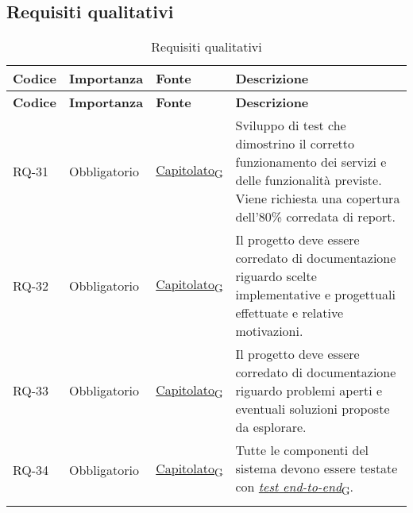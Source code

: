 \subsection{Requisiti qualitativi}
\begin{longtable}{|>{\centering\arraybackslash}m{}|>{\centering\arraybackslash}m{}|>{\centering\arraybackslash}m{}|>{\centering\arraybackslash}m{}|}
	\hline
	\textbf{Codice} & \textbf{Importanza} & \textbf{Fonte}                                                                                                    & \textbf{Descrizione}                                                                                                                                                                            \\\hline
	\endfirsthead
	\hline
	\textbf{Codice} & \textbf{Importanza} & \textbf{Fonte}                                                                                                    & \textbf{Descrizione}                                                                                                                                                                            \\\hline
	\endhead
	RQ-31           & Obbligatorio        & \href{https://7last.github.io/docs/rtb/documentazione-interna/glossario\#capitolato}{Capitolato\textsubscript{G}} & Sviluppo di test che dimostrino il corretto funzionamento dei servizi e delle funzionalità previste. Viene richiesta una copertura dell'80\% corredata di report.                               \\\hline
	RQ-32           & Obbligatorio        & \href{https://7last.github.io/docs/rtb/documentazione-interna/glossario\#capitolato}{Capitolato\textsubscript{G}} & Il progetto deve essere corredato di documentazione riguardo scelte implementative e progettuali effettuate e relative motivazioni.                                                             \\\hline
	RQ-33           & Obbligatorio        & \href{https://7last.github.io/docs/rtb/documentazione-interna/glossario\#capitolato}{Capitolato\textsubscript{G}} & Il progetto deve essere corredato di documentazione riguardo problemi aperti e eventuali soluzioni proposte da esplorare.                                                                       \\\hline
	RQ-34           & Obbligatorio        & \href{https://7last.github.io/docs/rtb/documentazione-interna/glossario\#capitolato}{Capitolato\textsubscript{G}} & Tutte le componenti del sistema devono essere testate con \href{https://7last.github.io/docs/rtb/documentazione-interna/glossario\#test-end-to-end}{\textit{test end-to-end}\textsubscript{G}}. \\\hline
	\caption{Requisiti qualitativi}
	\label{table:2}
\end{longtable}

